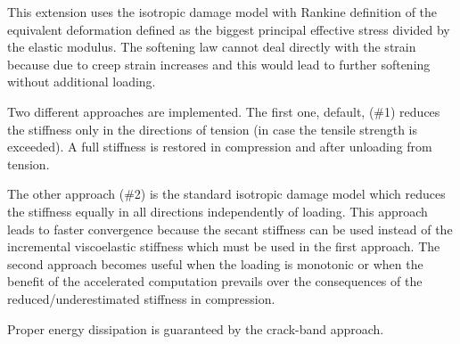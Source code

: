 \documentclass[a4paper]{article}
\begin{document}
This extension uses the isotropic damage model with Rankine definition of the equivalent deformation
defined as the biggest principal effective stress divided by the
elastic modulus. The softening law cannot deal directly with the
strain because due to creep strain increases and this would lead to
further softening without additional loading.

Two different approaches are implemented. The first one, default, (\#1) reduces
the stiffness only in the directions of tension (in case the tensile
strength is exceeded). A full stiffness is restored in compression and
after unloading from tension.  

The other approach (\#2) is the standard isotropic damage model which
reduces the stiffness equally in all directions independently of
loading. This approach leads to faster convergence because the secant
stiffness can be used instead of the incremental viscoelastic
stiffness which must be used in the first approach. The second
approach becomes useful when the loading is monotonic or when the
benefit of the accelerated computation prevails over the consequences
of the reduced/underestimated stiffness in compression. 

Proper energy dissipation is guaranteed by the crack-band approach.
\end{document}
